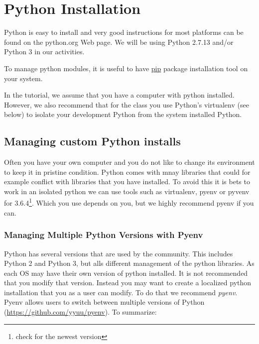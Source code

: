 \FILENAME

\section{Python Installation}\label{python-installation}

Python is easy to install and very good instructions for most platforms
can be found on the python.org Web page. We will be using Python 2.7.13
and/or Python 3 in our activities.

To manage python modules, it is useful to have
\href{https://pypi.python.org/pypi/pip}{pip} package installation tool
on your system.

In the tutorial, we assume that you have a computer with python
installed. However, we also recommend that for the class you use
Python's virtualenv (see below) to isolate your development Python from
the system installed Python.

\subsection{Managing custom Python
installs}\label{managing-custom-python-installs}

Often you have your own computer and you do not like to change its
environment to keep it in pristine condition. Python comes with mnay
libraries that could for example conflict with libraries that you have
installed. To avoid this it is bets to work in an isolated python we can
use tools such as virtualenv, pyenv or pyvenv for 3.6.4\footnote{check
  for the newest version}. Which you use
depends on you, but we highly recommend pyenv if you can.

\subsubsection{Managing Multiple Python Versions with
Pyenv}\label{S:managing-multiple-python-versions-with-pyenv}

Python has several versions that are used by the community. This
includes Python 2 and Python 3, but alls different management of the
python libraries. As each OS may have their own version of python
installed. It is not recommended that you modify that version. Instead
you may want to create a localized python installation that you as a
user can modify. To do that we recommend \emph{pyenv}. Pyenv allows
users to switch between multiple versions of Python
(\url{https://github.com/yyuu/pyenv}). To summarize:

